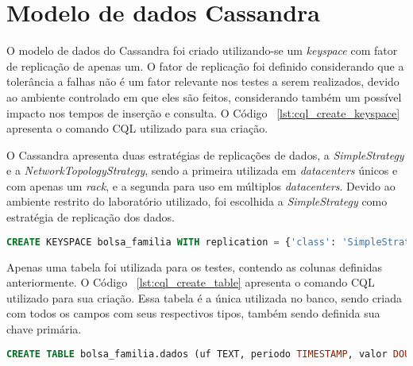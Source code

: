 \section{Modelo de dados Cassandra}
O modelo de dados do Cassandra foi criado utilizando-se um \emph{keyspace} com fator de replicação de apenas um. O fator de replicação foi definido considerando que a tolerância a falhas não é um fator relevante nos testes a serem realizados, devido ao ambiente controlado em que eles são feitos, considerando também um possível impacto nos tempos de inserção e consulta. O Código ~\ref{lst:cql_create_keyspace} apresenta o comando CQL utilizado para sua criação. 

O Cassandra apresenta duas estratégias de replicações de dados, a \emph{SimpleStrategy} e a \emph{NetworkTopologyStrategy}, sendo a primeira utilizada em \emph{datacenters} únicos e com apenas um \emph{rack}, e a segunda para uso em múltiplos \emph{datacenters}. Devido ao ambiente restrito do laboratório utilizado, foi escolhida a \emph{SimpleStrategy} como estratégia de replicação dos dados.

\noindent
\begin{minipage}[c]{1\textwidth}
\begin{lstlisting}[caption={Código CQL para criação do keyspace},label={lst:cql_create_keyspace},language=SQL]
CREATE KEYSPACE bolsa_familia WITH replication = {'class': 'SimpleStrategy', 'replication_factor': 1};
\end{lstlisting}
\end{minipage}

Apenas uma tabela foi utilizada para os testes, contendo as colunas definidas anteriormente. O Código ~\ref{lst:cql_create_table} apresenta o comando CQL utilizado para sua criação. Essa tabela é a única utilizada no banco, sendo criada com todos os campos com seus respectivos tipos, também sendo definida sua chave primária.

\noindent
\begin{minipage}[c]{1\textwidth}
	\begin{lstlisting}[caption={Código CQL para criação da tabela},label={lst:cql_create_table},language=SQL]
	CREATE TABLE bolsa_familia.dados (uf TEXT, periodo TIMESTAMP, valor DOUBLE, nis_favorecido BIGINT, cod_municipio INT, fonte TEXT, nome_favorecido TEXT, nome_municipio TEXT, PRIMARY KEY(nis_favorecido, periodo, valor));
	\end{lstlisting}
\end{minipage}

